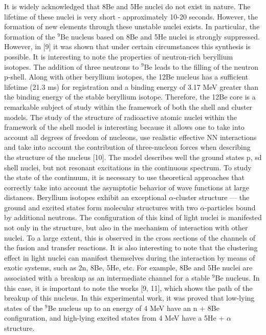 \documentclass[
12pt, %
oneside, %
english, %
onehalfspacing, %
onehalfspacing, %
headsepline, %
]{MastersDoctoralThesis} %
\begin{document}
It is widely acknowledged that 8Be and 5He nuclei do not exist in nature. 
The lifetime of these nuclei is very short -  approximately 10-20 seconds.
 However, the formation of new elements through these unstable nuclei exists. 
 In particular, the formation of the $^{9}$Be nucleus based on 8Be and 5He nuclei is strongly suppressed. 
 However, in [9] it was shown that under certain circumstances this synthesis is possible. 
It is interesting to note the properties of neutron-rich beryllium isotopes. The addition of three neutrons to $^{9}$Be leads to the filling of the neutron p-shell. Along with other beryllium isotopes, the 12Be nucleus has a sufficient lifetime (21.3 ms) for registration and a binding energy of 3.17 MeV greater than the binding energy of the stable beryllium isotope. Therefore, the 12Be core is a remarkable subject of study within the framework of both the shell and cluster models. The study of the structure of radioactive atomic nuclei within the framework of the shell model is interesting because it allows one to take into account all degrees of freedom of nucleons, use realistic effective NN interactions and take into account the contribution of three-nucleon forces when describing the structure of the nucleus [10]. The model describes well the ground states p, sd shell nuclei, but not resonant excitations in the continuous spectrum. To study the state of the continuum, it is necessary to use theoretical approaches that correctly take into account the asymptotic behavior of wave functions at large distances.
Beryllium isotopes exhibit an exceptional $\alpha$-cluster structure — the ground and excited states form molecular structures with two $\alpha$-particles bound by additional neutrons. The configuration of this kind of light nuclei is manifested not only in the structure, but also in the mechanism of interaction with other nuclei. To a large extent, this is observed in the cross sections of the channels of the fusion and transfer reactions. It is also interesting to note that the clustering effect in light nuclei can manifest themselves during the interaction by means of exotic systems, such as 2n, 8Be, 5He, etc. For example, 8Be and 5He nuclei are associated with a breakup as an intermediate channel for a stable $^{9}$Be nucleus. In this case, it is important to note the works [9, 11],  which shows the path of the breakup of this nucleus. In this experimental work, it was proved that low-lying states of the $^{9}$Be nucleus up to an energy of 4 MeV have an n + 8Be configuration, and high-lying excited states from 4 MeV have a 5He + $\alpha$ structure.
\end{document}
